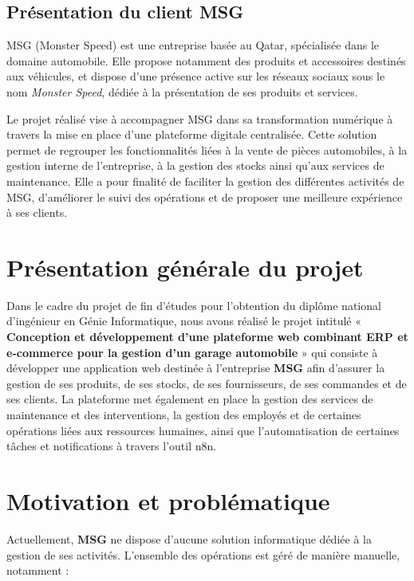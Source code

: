 \subsection{Présentation du client MSG}

MSG (Monster Speed) est une entreprise basée au Qatar, spécialisée dans le domaine automobile. Elle propose notamment des produits et accessoires destinés aux véhicules, et dispose d'une présence active sur les réseaux sociaux sous le nom \textit{Monster Speed}, dédiée à la présentation de ses produits et services.

Le projet réalisé vise à accompagner MSG dans sa transformation numérique à travers la mise en place d'une plateforme digitale centralisée. Cette solution permet de regrouper les fonctionnalités liées à la vente de pièces automobiles, à la gestion interne de l'entreprise, à la gestion des stocks ainsi qu'aux services de maintenance. Elle a pour finalité de faciliter la gestion des différentes activités de MSG, d'améliorer le suivi des opérations et de proposer une meilleure expérience à ses clients.


\section{Présentation générale du projet}

Dans le cadre du projet de fin d'études pour l'obtention du diplôme national d'ingénieur en Génie Informatique, nous avons réalisé le projet intitulé « \textbf{Conception et développement d'une plateforme web combinant \ac{ERP} et e-commerce pour la gestion d'un garage automobile} » qui consiste à développer une application web destinée à l'entreprise \textbf{MSG} afin d'assurer la gestion de ses produits, de ses stocks, de ses fournisseurs, de ses commandes et de ses clients. La plateforme met également en place la gestion des services de maintenance et des interventions, la gestion des employés et de certaines opérations liées aux ressources humaines, ainsi que l'automatisation de certaines tâches et notifications à travers l'outil n8n.


\section{Motivation et problématique}

Actuellement, \textbf{MSG} ne dispose d'aucune solution informatique dédiée à la gestion de ses activités. L'ensemble des opérations est géré de manière manuelle, notamment :


